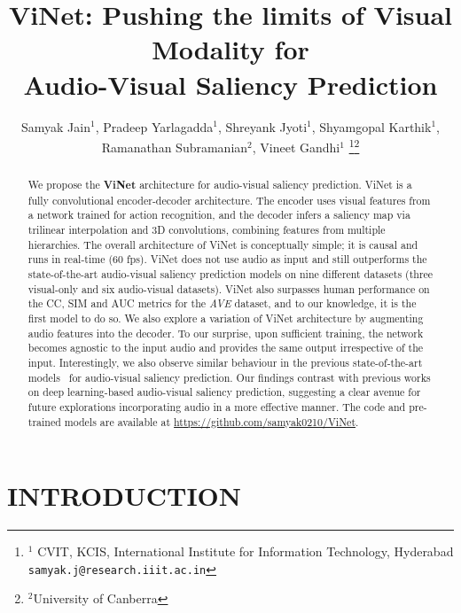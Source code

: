 \documentclass[letterpaper, 10 pt, conference]{ieeeconf}  \usepackage{times}
\title{\LARGE \bf
ViNet: Pushing the limits of Visual Modality for \\ Audio-Visual Saliency Prediction
}
\author{Samyak Jain$^{1}$,  Pradeep Yarlagadda$^{1}$,   Shreyank Jyoti$^{1}$,  Shyamgopal Karthik$^{1}$,  \\ Ramanathan Subramanian$^{2}$,  Vineet Gandhi$^{1}$ \thanks{$^{1}$ CVIT, KCIS, International Institute for Information Technology, Hyderabad
        {\tt\small samyak.j@research.iiit.ac.in}}\thanks{$^{2}$University of Canberra}}
\begin{document}
\def\x{{\mathbf x}}
\def\L{{\cal L}}
\def\eg{\textit{e.g.}}
\def\ie{\textit{i.e. }}
\def\Eg{\textit{E.g.}}
\def\etal{\textit{et al.}}
\def\etc{\textit{etc}}


\maketitle
\thispagestyle{empty}
\pagestyle{empty}


\begin{abstract}
We propose the \textbf{ViNet} architecture for audio-visual saliency prediction. ViNet is a fully convolutional encoder-decoder architecture. The encoder uses visual features from a network trained for action recognition, and the decoder infers a saliency map via trilinear interpolation and 3D convolutions, combining features from multiple hierarchies. The overall architecture of ViNet is conceptually simple; it is causal and runs in real-time (60 fps). ViNet does not use audio as input and still outperforms the state-of-the-art audio-visual saliency prediction models on nine different datasets (three visual-only and six audio-visual datasets). ViNet also surpasses human performance on the CC, SIM and AUC metrics for the \emph{AVE} dataset, and to our knowledge, it is the first model to do so. We also explore a variation of ViNet architecture by augmenting audio features into the decoder. To our surprise, upon sufficient training, the network becomes agnostic to the input audio and provides the same output irrespective of the input. Interestingly, we also observe similar behaviour in the previous state-of-the-art models~\cite{tsiami2020stavis} for audio-visual saliency prediction. Our findings contrast with previous works on deep learning-based audio-visual saliency prediction, suggesting a clear avenue for future explorations incorporating audio in a more effective manner. The code and pre-trained models are available at \url{https://github.com/samyak0210/ViNet}. 





\end{abstract}


\section{INTRODUCTION}
\end{document}
